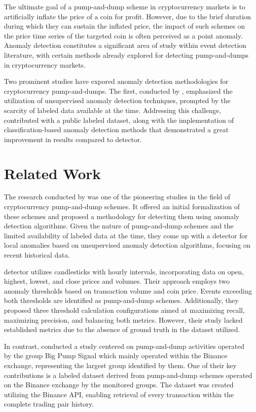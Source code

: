 \documentclass[12pt]{article}
\begin{document}
	The ultimate goal of a pump-and-dump scheme in cryptocurrency markets is to artificially inflate the price of a coin for profit.
	However, due to the brief duration during which they can sustain the inflated price, the impact of such schemes on the price time series of the targeted coin is often perceived as a point anomaly.
	Anomaly detection constitutes a significant area of study within event detection literature, with certain methods already explored for detecting pump-and-dumps in cryptocurrency markets.

	Two prominent studies have expored anomaly detection methodologies for cryptocurrency pump-and-dumps.
	The first, conducted by \citet{kamps2018}, emphasized the utilization of unsupervised anomaly detection techniques, prompted by the scarcity of labeled data available at the time.
	Addressing this challenge, \citet{lamorgia2020} contributed with a public labeled dataset, along with the implementation of classification-based anomaly detection methods that demonstrated a great improvement in results compared to \citet{kamps2018} detector.

	\section{Related Work}
	\label{sec_trab_relacionados}

	The research conducted by \citet{kamps2018} was one of the pioneering studies in the field of cryptocurrency pump-and-dump schemes.
	It offered an initial formalization of these schemes and proposed a methodology for detecting them using anomaly detection algorithms.
	Given the nature of pump-and-dump schemes and the limited availability of labeled data at the time, they come up with a detector for local anomalies based on unsupervised anomaly detection algorithms, focusing on recent historical data.

	\citet{kamps2018} detector utilizes candlesticks with hourly intervals, incorporating data on open, highest, lowest, and close prices and volumes.
	Their approach employs two anomaly thresholds based on transaction volume and coin price.
	Events exceeding both thresholds are identified as pump-and-dump schemes.
	Additionally, they proposed three threshold calculation configurations aimed at maximizing recall, maximizing precision, and balancing both metrics.
	However, their study lacked established metrics due to the absence of ground truth in the dataset utilized.

	In contrast, \citet{lamorgia2020} conducted a study centered on pump-and-dump activities operated by the group Big Pump Signal which mainly operated within the Binance exchange, representing the largest group identified by them.
	One of their key contributions is a labeled dataset derived from pump-and-dump schemes operated on the Binance exchange by the monitored groups.
	The dataset was created utilizing the Binance API, enabling retrieval of every transaction within the complete trading pair history.
\end{document}
